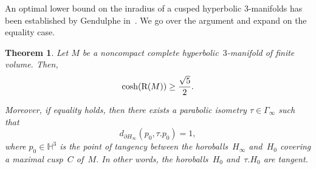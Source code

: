 \documentclass[11pt,reqno]{amsart}
\newtheorem{theorem}{Theorem}[section]
\theoremstyle{definition}
\numberwithin{equation}{section}
\newcommand{\HH}{{\mathbb H}}
\newcommand\RR{{\rm R}}
\numberwithin{equation}{section}
\begin{document}
An optimal lower bound on the inradius of a cusped hyperbolic $3$-manifolds has been established by Gendulphe in~\cite[Theorem~3.1]{gen}.
We go over the argument and expand on the equality case.


\begin{theorem} \label{theo:tau=1}
Let $M$ be a noncompact complete hyperbolic~$3$-manifold of finite volume.
Then,
\begin{equation} \label{eq:coshR>sqrt(5)/2}
\cosh(\RR(M))  \geq \frac{\sqrt{5}}{2}.
\end{equation}

Moreover, if equality holds, then there exists a parabolic isometry $\tau \in \Gamma_\infty$ such that
\begin{equation} \label{eq:Hinfinity}
d_{\partial H_\infty}(p_0,\tau.p_0) = 1,
\end{equation}
where $p_0 \in \HH^3$ is the point of tangency between the horoballs~$H_\infty$ and~$H_0$ covering a maximal cusp~$C$ of~$M$.
In other words, the horoballs~$H_0$ and~$\tau.H_0$ are tangent.
\end{theorem}
\end{document}
